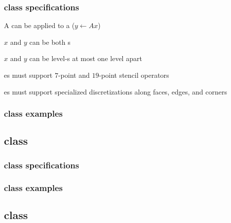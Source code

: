 \documentclass[11pt]{article}
\begin{document}
\subsubsection{ class specifications} \label{sss:matrix-specifications}


\BeginENUMERATE
\item A  can be applied to a  ($y \leftarrow A x$)
\item $x$ and $y$ can be both  s
\item $x$ and $y$ can be level-s at most one level apart
\item {}es must support $7$-point and $19$-point stencil operators
\item {}es must support specialized discretizations along  faces, edges, and corners
\EndENUMERATE

\subsubsection{ class examples} \label{sss:matrix-usecases}

\subsection{ class} \label{ss:stencil}

\subsubsection{ class specifications} \label{sss:stencil-specifications}

\subsubsection{ class examples} \label{sss:stencil-usecases}

\subsection{ class} \label{ss:discret}
\end{document}
